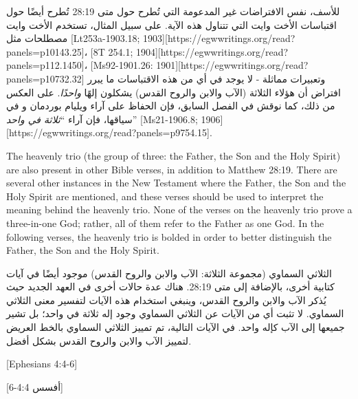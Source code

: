 للأسف، نفس الافتراضات غير المدعومة التي تُطرح حول متى 28:19 تُطرح أيضًا حول اقتباسات الأخت وايت التي تتناول هذه الآية. على سبيل المثال، تستخدم الأخت وايت مصطلحات مثل [Lt253a-1903.18; 1903][https://egwwritings.org/read?panels=p10143.25]، [8T 254.1; 1904][https://egwwritings.org/read?panels=p112.1450]، [Ms92-1901.26: 1901][https://egwwritings.org/read?panels=p10732.32] وتعبيرات مماثلة - لا يوجد في أي من هذه الاقتباسات ما يبرر افتراض أن هؤلاء الثلاثة (الآب والابن والروح القدس) يشكلون إلهًا \textit{واحدًا}. على العكس من ذلك، كما نوقش في الفصل السابق، فإن الحفاظ على آراء ويليام بوردمان و في سياقها، فإن آراء “\textit{ثلاثة في واحد}” [Ms21-1906.8; 1906][https://egwwritings.org/read?panels=p9754.15].


The heavenly trio (the group of three: the Father, the Son and the Holy Spirit) are also present in other Bible verses, in addition to Matthew 28:19. There are several other instances in the New Testament where the Father, the Son and the Holy Spirit are mentioned, and these verses should be used to interpret the meaning behind the heavenly trio. None of the verses on the heavenly trio prove a three-in-one God; rather, all of them refer to the Father as one God. In the following verses, the heavenly trio is bolded in order to better distinguish the Father, the Son and the Holy Spirit.


الثلاثي السماوي (مجموعة الثلاثة: الآب والابن والروح القدس) موجود أيضًا في آيات كتابية أخرى، بالإضافة إلى متى 28:19. هناك عدة حالات أخرى في العهد الجديد حيث يُذكر الآب والابن والروح القدس، وينبغي استخدام هذه الآيات لتفسير معنى الثلاثي السماوي. لا تثبت أي من الآيات عن الثلاثي السماوي وجود إله ثلاثة في واحد؛ بل تشير جميعها إلى الآب كإله واحد. في الآيات التالية، تم تمييز الثلاثي السماوي بالخط العريض لتمييز الآب والابن والروح القدس بشكل أفضل.


[Ephesians 4:4-6]


[أفسس 4:4-6]


